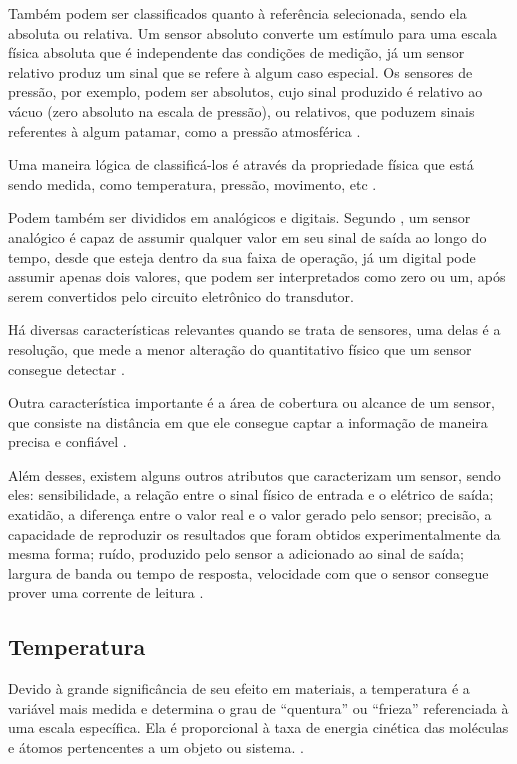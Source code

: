 Também podem ser classificados quanto à referência selecionada, sendo ela absoluta ou relativa. Um sensor
absoluto converte um estímulo para uma escala física absoluta que é independente das condições de medição, já
um sensor relativo produz um sinal que se refere à algum caso especial. Os sensores de pressão, por exemplo,
podem ser absolutos, cujo sinal produzido é relativo ao vácuo (zero absoluto na escala de pressão), ou
relativos, que poduzem sinais referentes à algum patamar, como a pressão atmosférica \cite{fraden2010}.

Uma maneira lógica de classificá-los é através da propriedade física que está sendo medida, como
temperatura, pressão, movimento, etc \cite{kenny_walt2005}.

Podem também ser divididos em analógicos e digitais. Segundo , um sensor
analógico é capaz de assumir qualquer valor em seu sinal de saída ao longo do tempo, desde que esteja dentro
da sua faixa de operação, já um digital pode assumir apenas dois valores, que podem ser interpretados como
zero ou um, após serem convertidos pelo circuito eletrônico do transdutor.

Há diversas características relevantes quando se trata de sensores, uma delas é a resolução, que mede a
menor alteração do quantitativo físico que um sensor consegue detectar \cite{sinclair2001}.

Outra característica importante é a área de cobertura ou alcance de um sensor, que consiste na distância em
que ele consegue captar a informação de maneira precisa e confiável \cite{karl_willig2005}.

Além desses, existem alguns outros atributos que caracterizam um sensor, sendo eles: sensibilidade, a relação
entre o sinal físico de entrada e o elétrico de saída; exatidão, a diferença entre o valor real e o valor
gerado pelo sensor; precisão, a capacidade de reproduzir os resultados que foram obtidos experimentalmente da
mesma forma; ruído, produzido pelo sensor a adicionado ao sinal de saída; largura de banda ou tempo de
resposta, velocidade com que o sensor consegue prover uma corrente de leitura
\cite{kenny_walt2005,kondrasovas2013}.

\subsection{Temperatura}
Devido à grande significância de seu efeito em materiais, a temperatura é a variável mais medida e determina o
grau de ``quentura'' ou ``frieza'' referenciada à uma escala específica. Ela é proporcional à taxa de energia
cinética das moléculas e átomos pertencentes a um objeto ou sistema.
\cite{fontes2005,peeters_peetermans_indesteege2007}.

